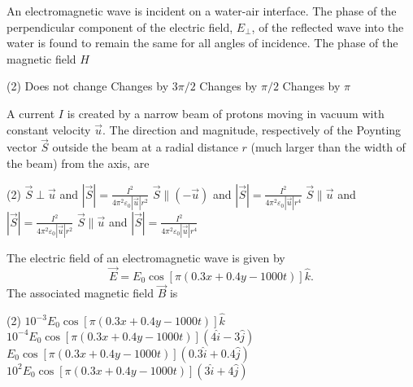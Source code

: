 \begin{enumerate}
\begin{minipage}{\textwidth}
	\item An electromagnetic wave is incident on a water-air interface. The phase of the perpendicular component of the electric field, $E_{\perp}$, of the reflected wave into the water is found to remain the same for all angles of incidence. The phase of the magnetic field $H$
\end{minipage}
\begin{tasks}(2)
	\task[\textbf{A.}]Does not change
	\task[\textbf{B.}]Changes by $3 \pi / 2$
	\task[\textbf{C.}]Changes by $\pi / 2$
	\task[\textbf{D.}]Changes by $\pi$
\end{tasks}

\begin{minipage}{\textwidth}
	\item A current $I$ is created by a narrow beam of protons moving in vacuum with constant velocity $\vec{u}$. The direction and magnitude, respectively of the Poynting vector $\vec{S}$ outside the beam at a radial distance $r$ (much larger than the width of the beam) from the axis, are
\end{minipage}
\begin{tasks}(2)
	\task[\textbf{A.}] $\vec{S} \perp \vec{u}$ and $|\vec{S}|=\frac{I^{2}}{4 \pi^{2} \varepsilon_{0}|\vec{u}| r^{2}}$
	\task[\textbf{B.}]$\vec{S} \|(-\vec{u})$ and $|\vec{S}|=\frac{I^{2}}{4 \pi^{2} \varepsilon_{0}|\vec{u}| r^{4}}$
	\task[\textbf{C.}]$\vec{S} \| \vec{u}$ and $|\vec{S}|=\frac{I^{2}}{4 \pi^{2} \varepsilon_{0}|\vec{u}| r^{2}}$
	\task[\textbf{D.}]$\vec{S} \| \vec{u}$ and $|\vec{S}|=\frac{I^{2}}{4 \pi^{2} \varepsilon_{0}|\vec{u}| r^{4}}$
\end{tasks}
\begin{minipage}{\textwidth}
	\item The electric field of an electromagnetic wave is given by
	$$
	\vec{E}=E_{0} \cos [\pi(0.3 x+0.4 y-1000 t)] \hat{k} .
	$$
	The associated magnetic field $\vec{B}$ is
\end{minipage}
\begin{tasks}(2)
	\task[\textbf{A.}] $10^{-3} E_{0} \cos [\pi(0.3 x+0.4 y-1000 t)] \hat{k}$
	\task[\textbf{B.}]$10^{-4} E_{0} \cos [\pi(0.3 x+0.4 y-1000 t)](4 \hat{i}-3 \hat{j})$
	\task[\textbf{C.}]$E_{0} \cos [\pi(0.3 x+0.4 y-1000 t)](0.3 \hat{i}+0.4 \hat{j})$
	\task[\textbf{D.}]$10^{2} E_{0} \cos [\pi(0.3 x+0.4 y-1000 t)](3 \hat{i}+4 \hat{j})$
\end{tasks}

\end{enumerate}
